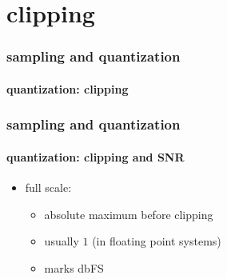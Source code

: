 \section[clipping]{clipping}

	\begin{frame}\frametitle{sampling and quantization}\framesubtitle{quantization: clipping}
	\end{frame}	
	
	\begin{frame}\frametitle{sampling and quantization}\framesubtitle{quantization: clipping and SNR}
        
     \begin{itemize}
         \item[] full scale:
            \begin{itemize}
                \item   absolute maximum before clipping
                \item   usually $1$ (in floating point systems)
                \item   marks \unit[0]{dbFS}
            \end{itemize}
     \end{itemize}
	\end{frame}
	

